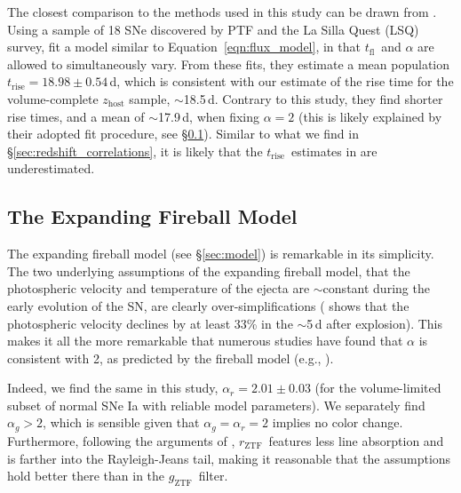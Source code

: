 \documentclass[twocolumn]{./aastex63}
\newcommand{\rztf}{$r_\mathrm{ZTF}$}
\newcommand{\gztf}{$g_\mathrm{ZTF}$}
\newcommand{\tfl}{$t_\mathrm{fl}$}
\newcommand{\trise}{$t_\mathrm{rise}$}
\begin{document}
The closest comparison to the methods used in this study can be drawn from
\citet{Firth15}. Using a sample of 18 SNe discovered by PTF and the La Silla
Quest (LSQ) survey, \citeauthor{Firth15} fit a model similar to
Equation~\ref{eqn:flux_model}, in that \tfl\ and $\alpha$ are allowed to
simultaneously vary. From these fits, they estimate a mean population \trise$ =
18.98 \pm 0.54$\,d, which is consistent with our estimate of the rise time for
the volume-complete $z_\mathrm{host}$ sample, $\sim$18.5\,d. Contrary to this
study, they find shorter rise times, and a mean of $\sim$17.9\,d, when fixing
$\alpha = 2$ (this is likely explained by their adopted fit procedure, see
\S\ref{sec:fireball_discussion}). Similar to what we find in
\S\ref{sec:redshift_correlations}, it is likely that the \trise\ estimates in
\citet{Firth15} are underestimated.

\subsection{The Expanding Fireball Model}\label{sec:fireball_discussion}

The expanding fireball model (see \S\ref{sec:model}) is remarkable in its
simplicity. The two underlying assumptions of the expanding fireball model, that
the photospheric velocity and temperature of the ejecta are $\sim$constant
during the early evolution of the SN, are clearly over-simplifications
(\citealt{Parrent12} shows that the photospheric velocity declines by at least
33\% in the $\sim$5\,d after explosion). This makes it all the more remarkable
that numerous studies have found that $\alpha$ is consistent with 2, as
predicted by the fireball model (e.g.,
\citealt{Conley06,Hayden10,Ganeshalingam11,Gonzalez-Gaitan12,Zheng17a}).

Indeed, we find the same in this study, $\alpha_r = 2.01 \pm 0.03$ (for the
volume-limited subset of normal SNe Ia with reliable model parameters). We
separately find $\alpha_g > 2$, which is sensible given that $\alpha_g =
\alpha_r = 2$ implies no color change. Furthermore, following the arguments of
\citet{Riess99a}, \rztf\ features less line absorption and is farther into the
Rayleigh-Jeans tail, making it reasonable that the assumptions hold better there
than in the \gztf\ filter.
\end{document}
